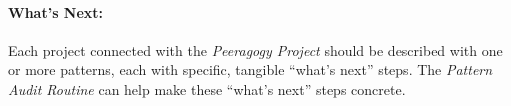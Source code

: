 \paragraph{What's Next:}  Each project connected with the \emph{Peeragogy Project} should be described with one or more patterns, each with specific, tangible ``what's next'' steps.  The \emph{Pattern Audit Routine} can help make these ``what's next'' steps concrete. 

